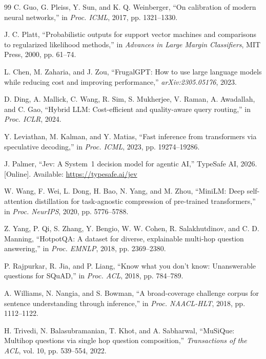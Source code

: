 \documentclass[twocolumn]{ICCKjournal}
\begin{document}
\begin{fullwidth}
\begin{thebibliography}{99}
C. Guo, G. Pleiss, Y. Sun, and K. Q. Weinberger, ``On calibration of modern neural networks,'' in \textit{Proc. ICML}, 2017, pp. 1321--1330.

J. C. Platt, ``Probabilistic outputs for support vector machines and comparisons to regularized likelihood methods,'' in \textit{Advances in Large Margin Classifiers}, MIT Press, 2000, pp. 61--74.

L. Chen, M. Zaharia, and J. Zou, ``FrugalGPT: How to use large language models while reducing cost and improving performance,'' \textit{arXiv:2305.05176}, 2023.

D. Ding, A. Mallick, C. Wang, R. Sim, S. Mukherjee, V. Raman, A. Awadallah, and C. Gao, ``Hybrid LLM: Cost-efficient and quality-aware query routing,'' in \textit{Proc. ICLR}, 2024.

Y. Leviathan, M. Kalman, and Y. Matias, ``Fast inference from transformers via speculative decoding,'' in \textit{Proc. ICML}, 2023, pp. 19274--19286.

J. Palmer, ``Jev: A System~1 decision model for agentic AI,'' TypeSafe AI, 2026. [Online]. Available: \url{https://typesafe.ai/jev}

W. Wang, F. Wei, L. Dong, H. Bao, N. Yang, and M. Zhou, ``MiniLM: Deep self-attention distillation for task-agnostic compression of pre-trained transformers,'' in \textit{Proc. NeurIPS}, 2020, pp. 5776--5788.

Z. Yang, P. Qi, S. Zhang, Y. Bengio, W. W. Cohen, R. Salakhutdinov, and C. D. Manning, ``HotpotQA: A dataset for diverse, explainable multi-hop question answering,'' in \textit{Proc. EMNLP}, 2018, pp. 2369--2380.

P. Rajpurkar, R. Jia, and P. Liang, ``Know what you don't know: Unanswerable questions for SQuAD,'' in \textit{Proc. ACL}, 2018, pp. 784--789.

A. Williams, N. Nangia, and S. Bowman, ``A broad-coverage challenge corpus for sentence understanding through inference,'' in \textit{Proc. NAACL-HLT}, 2018, pp. 1112--1122.

H. Trivedi, N. Balasubramanian, T. Khot, and A. Sabharwal, ``MuSiQue: Multihop questions via single hop question composition,'' \textit{Transactions of the ACL}, vol. 10, pp. 539--554, 2022.


\end{thebibliography}
\end{fullwidth}
\end{document}
